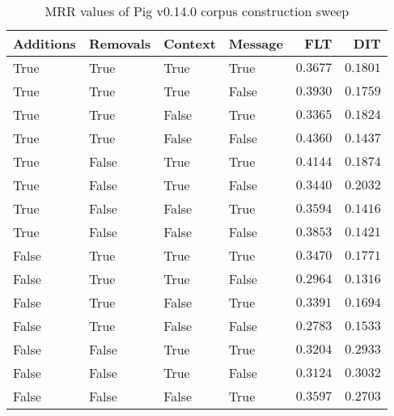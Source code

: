 
\begin{table}
\begin{spacing}{1.2}
\centering
\caption{MRR values of Pig v0.14.0 corpus construction sweep}
\label{table:pig_corpus_sweep}
\vspace{0.2em}
\begin{tabular}{llll|rr}
\toprule
Additions & Removals & Context & Message & FLT &        DIT \\
\midrule
     True &     True &    True &    True &         $0.3677$ &      $0.1801$ \\
     \myrowcolor True &     True &    True &   False &         $0.3930$ &      $0.1759$ \\
     True &     True &   False &    True &         $0.3365$ &      $0.1824$ \\
     True &     True &   False &   False &    $\bm{0.4360}$ &      $0.1437$ \\
     True &    False &    True &    True &         $0.4144$ &      $0.1874$ \\
     True &    False &    True &   False &         $0.3440$ &      $0.2032$ \\
     True &    False &   False &    True &         $0.3594$ &      $0.1416$ \\
     True &    False &   False &   False &         $0.3853$ &      $0.1421$ \\
    False &     True &    True &    True &         $0.3470$ &      $0.1771$ \\
    False &     True &    True &   False &         $0.2964$ &      $0.1316$ \\
    False &     True &   False &    True &         $0.3391$ &      $0.1694$ \\
    False &     True &   False &   False &         $0.2783$ &      $0.1533$ \\
    False &    False &    True &    True &         $0.3204$ &      $0.2933$ \\
    False &    False &    True &   False &         $0.3124$ & $\bm{0.3032}$ \\
    False &    False &   False &    True &         $0.3597$ &      $0.2703$ \\
\bottomrule
\end{tabular}

\end{spacing}
\end{table}
